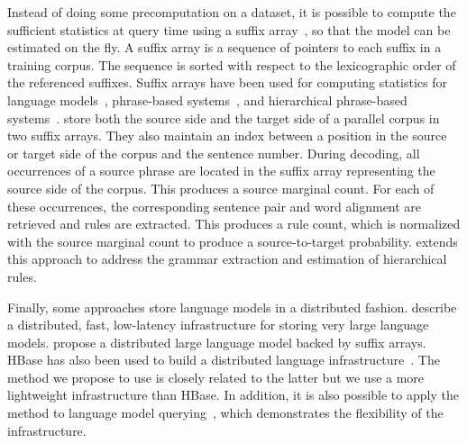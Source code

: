 
Instead of doing some precomputation on a dataset, it is possible to compute the sufficient
statistics at query time using a suffix array~\citep{manber-myers:1990:SIAM}, so
that the model can be estimated on the fly. A suffix array is a sequence of
pointers to each suffix in a training corpus. The sequence is sorted with
respect to the lexicographic order of the referenced suffixes. Suffix arrays
have been used for computing statistics for language
models~\citep{zhang-vogel:2006:techreport}, phrase-based
systems~\citep{callisonburch-bannard-schroeder:2005:ACL,zhang-vogel:2005:EAMT},
and hierarchical phrase-based systems~\citep{lopez:2007:EMNLP-CoNLL}.
\citet{callisonburch-bannard-schroeder:2005:ACL} store both the source side
and the target side of a parallel corpus in two suffix arrays. They also maintain
an index between a position in the source or target side of the corpus and the
sentence number. During decoding, all occurrences of a source phrase
are located in the suffix array representing the source side of the corpus.
This produces a source marginal count. For each of these occurrences, the corresponding
sentence pair and word alignment are retrieved and rules are extracted. This produces
a rule count, which is normalized with the source marginal count to produce a
source-to-target probability. \citet{lopez:2007:EMNLP-CoNLL} extends this approach
to address the grammar extraction and estimation of hierarchical rules.



Finally, some approaches store language models in a distributed fashion.
\citet{brants-popat-xu-och-dean:2007:EMNLP-CoNLL} describe a distributed, fast,
low-latency infrastructure for storing very large language models.
\citet{zhang-hildebrand-vogel:2006:EMNLP} propose a distributed large language
model backed by suffix arrays. HBase has also been used to build a distributed
language infrastructure~\citep{yu:2008:mastersthesis}. The method we propose to
use is closely related to the latter but we use a more lightweight
infrastructure than HBase. In addition, it is also possible to apply the method
to language model querying~\citep{pino-waite-byrne:2012:PBML}, which
demonstrates the flexibility of the infrastructure.

